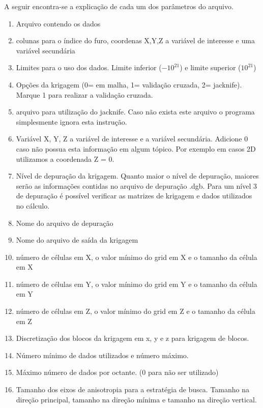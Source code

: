 \begin{small}
	\begingroup
	
	\endgroup
\end{small}

A seguir encontra-se a explicação de cada um dos parâmetros do arquivo.

\begin{enumerate}
	\item Arquivo contendo os dados 
	\item colunas para o índice do furo, coordenas X,Y,Z a variável de interesse e uma variável secundária
	\item Limites para o uso dos dados. Limite inferior ($-10 ^{21}$) e limite superior ($10 ^{21} $)
	\item Opções da krigagem (0= em malha, 1= validação cruzada, 2= jacknife). Marque 1 para realizar a validação cruzada.
	\item arquivo para utilização do jacknife. Caso não exista este arquivo o programa simplesmente ignora esta instrução.
	\item Variável X, Y, Z a variável de interesse e a variável secundária. Adicione 0 caso não possua esta informação em algum tópico. Por exemplo em casos 2D utilizamos a coordenada Z = 0.
	\item Nível de depuração da krigagem. Quanto maior o nível de depuração, maiores serão as informações contidas no arquivo de depuração .dgb. Para um nível 3 de depuração é possível verificar as matrizes de krigagem e dados utilizados no cálculo. 
	\item Nome do arquivo de depuração
	\item Nome do arquivo de saída da krigagem 
	\item número de células em X, o valor mínimo do grid em X e o tamanho da célula em X
	\item número de células em Y, o valor mínimo do grid em Y e o tamanho da célula em Y
	\item número de células em Z, o valor mínimo do grid em Z e o tamanho da célula em Z
	\item Discretização dos blocos da krigagem em x, y e z para krigagem de blocos.
	\item Número mínimo de dados utilizados e número máximo.
	\item Máximo número de dados por octante. (0 para não ser utilizado)
	\item Tamanho dos eixos de anisotropia para a estratégia de busca. Tamanho na direção principal, tamanho na direção mínima e tamanho na direção vertical.

\end{enumerate}
